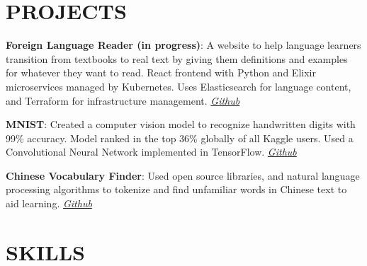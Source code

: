 \documentclass[margin]{res}
\begin{document}
\begin{resume}
\section{PROJECTS}

\par
\textbf{Foreign Language Reader (in progress)}:
A website to help language learners transition from textbooks to real text by giving them definitions and examples for whatever they want to read. React frontend with Python and Elixir microservices managed by Kubernetes. Uses Elasticsearch for language content, and Terraform for infrastructure management. \textit{\href{https://github.com/lucaskjaero/foreign-language-reader}{Github}}

\par
\textbf{MNIST}:
Created a computer vision model to recognize handwritten digits with 99\% accuracy. Model ranked in the top 36\% globally of all Kaggle users. Used a Convolutional Neural Network implemented in TensorFlow. \textit{\href{https://github.com/lucaskjaero/MNIST}{Github}}

\par
\textbf{Chinese Vocabulary Finder}:
Used open source libraries, and natural language processing algorithms to tokenize and find unfamiliar words in Chinese text to aid learning. \textit{\href{https://github.com/lucaskjaero/Chinese-Vocabulary-Finder}{Github}}


\section{SKILLS}


\end{resume}
\end{document}
